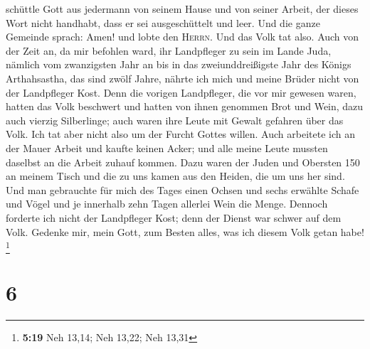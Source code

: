 schüttle Gott aus jedermann von seinem Hause und von seiner Arbeit, der
dieses Wort nicht handhabt, dass er sei ausgeschüttelt und leer. Und die
ganze Gemeinde sprach: Amen! und lobte den \textsc{Herrn}. Und das Volk
tat also.  Auch von der Zeit an, da mir befohlen ward,
ihr Landpfleger zu sein im Lande Juda, nämlich vom zwanzigsten Jahr an
bis in das zweiunddreißigste Jahr des Königs Arthahsastha, das sind
zwölf Jahre, nährte ich mich und meine Brüder nicht von der Landpfleger
Kost.  Denn die vorigen Landpfleger, die vor mir gewesen
waren, hatten das Volk beschwert und hatten von ihnen genommen Brot und
Wein, dazu auch vierzig Silberlinge; auch waren ihre Leute mit Gewalt
gefahren über das Volk. Ich tat aber nicht also um der Furcht Gottes
willen.  Auch arbeitete ich an der Mauer Arbeit und
kaufte keinen Acker; und alle meine Leute mussten daselbst an die Arbeit
zuhauf kommen.  Dazu waren der Juden und Obersten 150 an
meinem Tisch und die zu uns kamen aus den Heiden, die um uns her sind.
 Und man gebrauchte für mich des Tages einen Ochsen und
sechs erwählte Schafe und Vögel und je innerhalb zehn Tagen allerlei
Wein die Menge. Dennoch forderte ich nicht der Landpfleger Kost; denn
der Dienst war schwer auf dem Volk.  Gedenke mir, mein
Gott, zum Besten alles, was ich diesem Volk getan habe! \footnote{\textbf{5:19}
  Neh 13,14; Neh 13,22; Neh 13,31}

\hypertarget{section-1}{%
\section{6}\label{section-1}}

